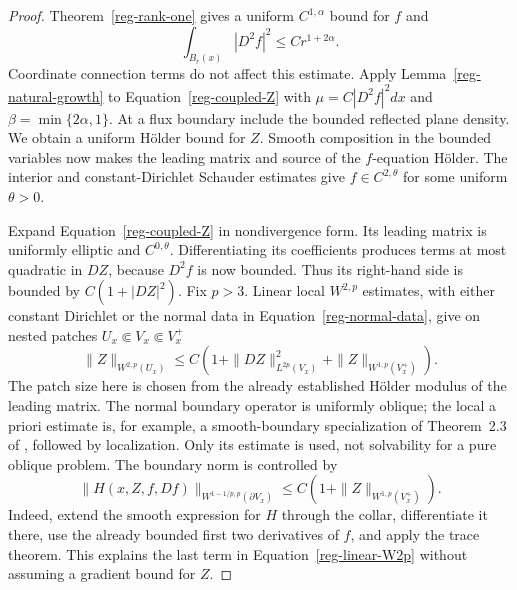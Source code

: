 \begin{proof}
Theorem~\ref{reg-rank-one} gives a uniform $C^{1,\alpha}$ bound
for $f$ and
\begin{equation}
 \int_{B_r(x)}|D^2f|^2\le Cr^{1+2\alpha}.
 \label{reg-bootstrap-measure}
\end{equation}
Coordinate connection terms do not affect this estimate. Apply
Lemma~\ref{reg-natural-growth} to Equation~\eqref{reg-coupled-Z}
with $\mu=C|D^2f|^2dx$ and
$\beta=\min\{2\alpha,1\}$. At a flux boundary include the
bounded reflected plane density. We obtain a uniform H\"older
bound for $Z$. Smooth composition in the bounded variables now
makes the leading matrix and source of the $f$-equation H\"older.
The interior and constant-Dirichlet Schauder estimates give
$f\in C^{2,\theta}$ for some uniform $\theta>0$.

Expand Equation~\eqref{reg-coupled-Z} in nondivergence form.
Its leading matrix is uniformly elliptic and $C^{0,\theta}$.
Differentiating its coefficients produces terms at most quadratic
in $DZ$, because $D^2f$ is now bounded. Thus its right-hand side
is bounded by $C(1+|DZ|^2)$. Fix $p>3$. Linear local $W^{2,p}$
estimates, with either constant Dirichlet or the normal data in
Equation~\eqref{reg-normal-data}, give on nested patches
$U_x\Subset V_x\Subset V_x^+$
\begin{equation}
 \|Z\|_{W^{2,p}(U_x)}
 \le C\left(1+\|DZ\|_{L^{2p}(V_x)}^2
                         +\|Z\|_{W^{1,p}(V_x^+)}\right).
 \label{reg-linear-W2p}
\end{equation}
The patch size here is chosen from the already established
H\"older modulus of the leading matrix. The normal boundary
operator is uniformly oblique; the local a priori estimate is,
for example, a smooth-boundary specialization of Theorem~2.3
of \cite{dongli2022}, followed by localization. Only its estimate
is used, not solvability for a pure oblique problem. The boundary
norm is controlled by
\begin{equation}
 \|H(x,Z,f,Df)\|_{W^{1-1/p,p}(\partial V_x)}
       \le C\left(1+\|Z\|_{W^{1,p}(V_x^+)}\right).
 \label{reg-boundary-trace}
\end{equation}
Indeed, extend the smooth expression for $H$ through the collar,
differentiate it there, use the already bounded first two
derivatives of $f$, and apply the trace theorem. This explains
the last term in Equation~\eqref{reg-linear-W2p} without assuming
a gradient bound for $Z$.


\end{proof}
